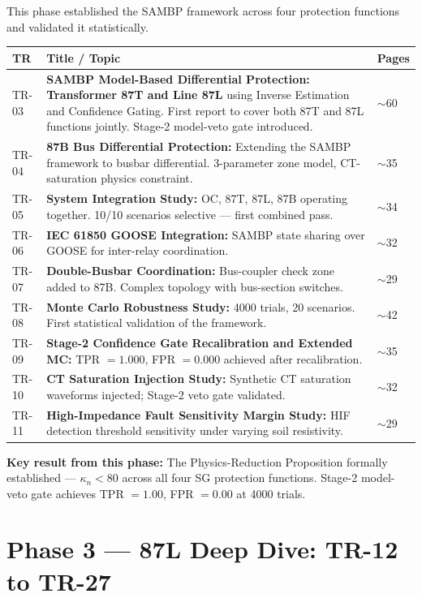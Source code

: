 \documentclass[11pt,a4paper]{article}
\begin{document}
This phase established the SAMBP framework across four protection functions and
validated it statistically.

\begin{longtable}{lp{9.5cm}l}
\toprule
\textbf{TR} & \textbf{Title / Topic} & \textbf{Pages} \\
\midrule
\endhead
TR-03 & \textbf{SAMBP Model-Based Differential Protection: Transformer 87T and Line 87L} using Inverse Estimation and Confidence Gating. First report to cover both 87T and 87L functions jointly. Stage-2 model-veto gate introduced. & $\sim$60 \\[3pt]
TR-04 & \textbf{87B Bus Differential Protection:} Extending the SAMBP framework to busbar differential. 3-parameter zone model, CT-saturation physics constraint. & $\sim$35 \\[3pt]
TR-05 & \textbf{System Integration Study:} OC, 87T, 87L, 87B operating together. 10/10 scenarios selective — first combined pass. & $\sim$34 \\[3pt]
TR-06 & \textbf{IEC 61850 GOOSE Integration:} SAMBP state sharing over GOOSE for inter-relay coordination. & $\sim$32 \\[3pt]
TR-07 & \textbf{Double-Busbar Coordination:} Bus-coupler check zone added to 87B. Complex topology with bus-section switches. & $\sim$29 \\[3pt]
TR-08 & \textbf{Monte Carlo Robustness Study:} 4000 trials, 20 scenarios. First statistical validation of the framework. & $\sim$42 \\[3pt]
TR-09 & \textbf{Stage-2 Confidence Gate Recalibration and Extended MC:} TPR $= 1.000$, FPR $= 0.000$ achieved after recalibration. & $\sim$35 \\[3pt]
TR-10 & \textbf{CT Saturation Injection Study:} Synthetic CT saturation waveforms injected; Stage-2 veto gate validated. & $\sim$32 \\[3pt]
TR-11 & \textbf{High-Impedance Fault Sensitivity Margin Study:} HIF detection threshold sensitivity under varying soil resistivity. & $\sim$29 \\[3pt]
\bottomrule
\end{longtable}

\textbf{Key result from this phase:} The Physics-Reduction Proposition
formally established — $\kappa_n < 80$ across all four SG protection functions.
Stage-2 model-veto gate achieves TPR $= 1.00$, FPR $= 0.00$ at 4000 trials.

\section{Phase 3 — 87L Deep Dive: TR-12 to TR-27}
\end{document}
